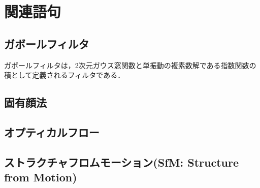 \chapter{関連語句}
\section{ガボールフィルタ}
ガボールフィルタは，2次元ガウス窓関数と単振動の複素数解である指数関数の積として定義されるフィルタである\cite[p.149]{数学テクノロジー入門}．
\section{固有顔法}
\section{オプティカルフロー}
\section{ストラクチャフロムモーション(SfM: Structure from Motion)}